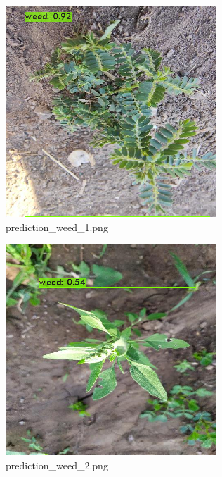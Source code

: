 \documentclass[12pt]{exam}
\begin{document}
\begin{questions}
\begin{parts}
		\hfill

		\begin{figure}[H]
			\includegraphics[width=\textwidth]{images-yolo/prediction_weed_1.png}
			\caption{prediction\_weed\_1.png}
		\end{figure}

		\hfill

		\begin{figure}[H]
			\includegraphics[width=\textwidth]{images-yolo/prediction_weed_2.png}
			\caption{prediction\_weed\_2.png}
		\end{figure}


\end{parts}
\end{questions}
\end{document}
